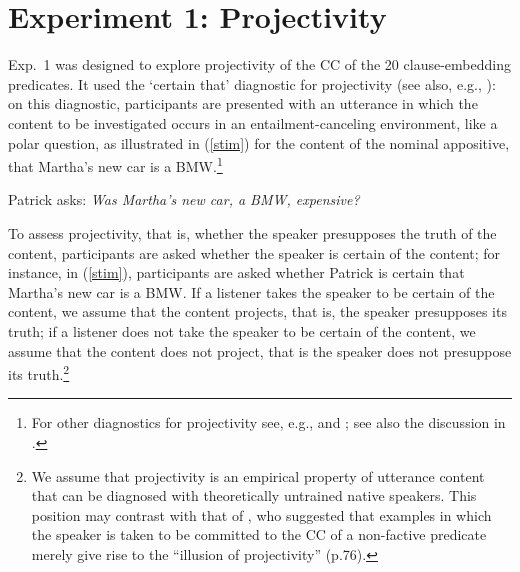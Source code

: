 \documentclass[11pt,fleqn]{article}
\newcommand{\6}{\mbox{$[\hspace*{-.6mm}[$}}
\newcommand{\9}{\mbox{$]\hspace*{-.6mm}]$}}
\begin{document}
%
%
%
%


\section{Experiment 1: Projectivity}\label{s2}

Exp.~1 was designed to explore projectivity of the CC of the 20 clause-embedding predicates. It used the `certain that' diagnostic for projectivity (see also, e.g., \citealt{tonhauser-salt26,djaerv-bacovcin-salt27,stevens-etal2017,tbd-variability,mahler-nels,demarneffe-etal-sub23}): on this diagnostic, participants are presented with an utterance in which the content to be investigated occurs in an entailment-canceling environment, like a polar question, as illustrated in (\ref{stim}) for the content of the nominal appositive, that Martha's new car is a BMW.\footnote{For other diagnostics for projectivity see, e.g., \citealt{smith-hall11,xue-onea11} and \citealt{brst-lang11}; see also the discussion in \citealt{tbd-variability}.} 

\begin{exe}

\ex\label{stim} Patrick asks: {\em Was Martha's new car, a BMW, expensive?} 

\end{exe}
To assess projectivity, that is, whether the speaker presupposes the truth of the content, participants are asked whether the speaker is certain of the content; for instance, in (\ref{stim}), participants are asked whether Patrick is certain that Martha's new car is a BMW. If a listener takes the speaker to be certain of the content, we assume that the content projects, that is, the speaker presupposes its truth; if a listener does not take the speaker to be certain of the content, we assume that the content does not project, that is the speaker does not presuppose its truth.\footnote{We assume that projectivity is an empirical property of utterance content that can be diagnosed with theoretically untrained native speakers. This position may contrast with that of \citet{anand-hacquard2014}, who suggested that examples in which the speaker is taken to be committed to the CC of a non-factive predicate merely give rise to the ``illusion of projectivity'' (p.76).} 
\end{document}
